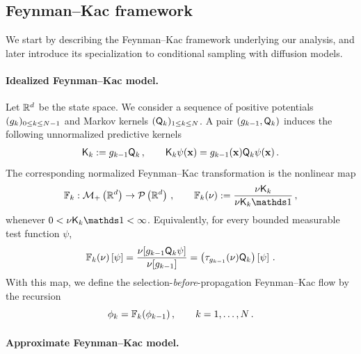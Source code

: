 \documentclass[11pt]{article}
\theoremstyle{plain}
\theoremstyle{definition}
\theoremstyle{remark}
\begin{document}
\subsection{Feynman--Kac framework}
\label{sec:fk_smc_general}

We start by describing the
Feynman--Kac framework underlying our analysis, and later introduce its specialization to conditional sampling with diffusion models.




\paragraph{Idealized Feynman--Kac model.}
Let $\mathbb{R}^d$ be the state space. We consider a sequence of positive potentials
$(\pot{k})_{0\le k\le N-1}$ and Markov kernels $(\mk{k})_{1\le k\le N}$.
A pair $(\pot{k-1}, \mk{k})$ induces the following unnormalized predictive kernels
\begin{align} \label{eq:fk_kernel_approx_intro}
\unpredictive{k} \eqdef \pot{k-1}\mk{k} \eqsp, \qquad
 \unpredictive{k} \psi(\x) = \pot{k-1}(\x)\mk{k}\psi(\x) \eqsp.
\end{align} 
The corresponding normalized Feynman--Kac transformation is the nonlinear map
\begin{equation} \label{eq:filter_recursion}
\filtertransform{k}: \measures{\rset^\xdim} \to \probmeasures{\rset^\xdim} \eqsp, \qquad
\filtertransform{k} (\nu) \eqdef \frac{\nu\unpredictive{k}} {\nu\unpredictive{k}\un} \eqsp,
\end{equation}
whenever $0<\nu\unpredictive{k}\un<\infty$. Equivalently, for every bounded measurable test function $\psi$,
$$
\filtertransform{k} (\nu) \left[\psi \right] = \frac{ \nu[\pot{k-1}\mk{k}\psi] }{ \nu[\pot{k-1}] } = \left( \tau_{\pot{k-1}}(\nu)\mk{k} \right) \left[\psi \right] \eqsp.
$$
With this map, we define the selection-\textit{before}-propagation Feynman--Kac flow by the recursion
$$
\filter{k} =\filtertransform{k} (\filter{k-1}) \eqsp, \qquad k=1,\dots,N \eqsp.
$$

\paragraph{Approximate Feynman--Kac model.}
\end{document}
